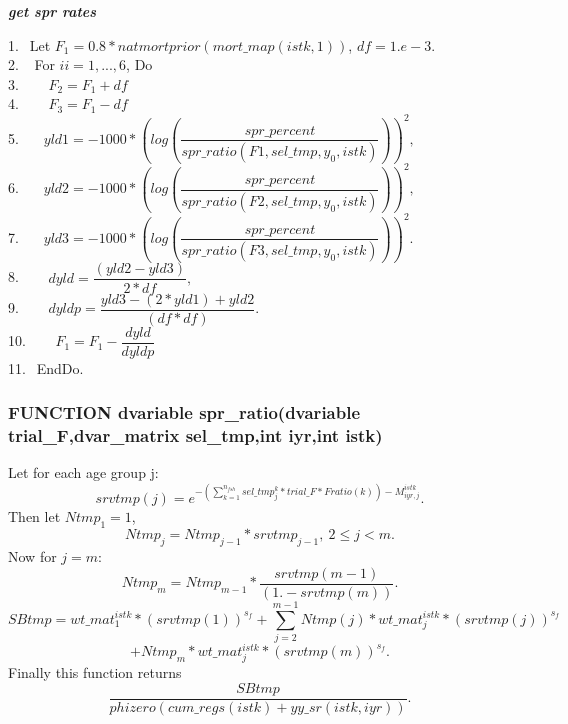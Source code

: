 \documentclass{article}
\begin{document}
 \begin{algorithm}[H]
	\caption{{\bf \textit{get spr rates}}}
	1. $\  \ $Let $F_1=0.8*natmortprior(mort\_map(istk,1))$, $df=1.e-3$. \\
    2. $\  \ $ For $ii=1,...,6$, Do \\
	3. $\  \ \quad$   $F_2 = F_1+df$\\
	4. $\  \ \quad$  $F_3 = F_1 -df$\\
	5. $\  \ \quad yld1 =-1000*\left(log\left(\dfrac{spr\_percent}{spr\_ratio(F1, sel\_tmp,y_0,istk)}\right)\right)^2,$\\
    6. $\  \ \quad yld2=-1000*\left(log\left(\dfrac{spr\_percent}{spr\_ratio(F2, sel\_tmp,y_0,istk)}\right)\right)^2,$\\
    7. $\  \ \quad yld3=-1000*\left(log\left(\dfrac{spr\_percent}{spr\_ratio(F3, sel\_tmp,y_0,istk)}\right)\right)^2.$\\
    8. $\  \ \quad$   $dyld=\dfrac{(yld2-yld3)}{2*df},$\\
    9. $\  \ \quad$   $dyldp=\dfrac{yld3-(2*yld1)+yld2}{(df*df)}$.\\
    10. $\  \ \quad$    $F_1=F_{1}-\dfrac{dyld}{dyldp}$\\
    11. $\  \ $EndDo.
    
\end{algorithm}




\subsubsection{FUNCTION dvariable spr\_ratio(dvariable trial\_F,dvar\_matrix sel\_tmp,int iyr,int istk)}

Let for each age group j:
\begin{equation}
    srvtmp(j)=e^{-(\sum_{k=1}^{n_{fsh}}sel\_tmp^k_j*trial\_F*Fratio(k))-M^{istk}_{iyr,j}}.
\end{equation}
Then let $Ntmp_1=1$,
\begin{equation}
    Ntmp_j=Ntmp_{j-1}*srvtmp_{j-1}, \  2\leq j < m.
\end{equation}
Now for $j=m$:
\begin{equation}
Ntmp_{m}=Ntmp_{m-1}*\dfrac{srvtmp(m-1)}{(1.-srvtmp(m))}.
\end{equation}
\begin{equation}
    SBtmp=wt\_mat^{istk}_1*(srvtmp(1))^{s_f}+\sum_{ j=2}^{m-1}Ntmp(j)*wt\_mat^{istk}_j*(srvtmp(j))^{s_f} 
\end{equation}
\begin{equation*}
+Ntmp_{m}*wt\_mat^{istk}_j*(srvtmp(m))^{s_f}.
\end{equation*}
Finally this function returns 
\begin{equation}
    \dfrac{SBtmp}{phizero(cum\_regs(istk)+yy\_sr(istk,iyr))}.
\end{equation}
\end{document}
